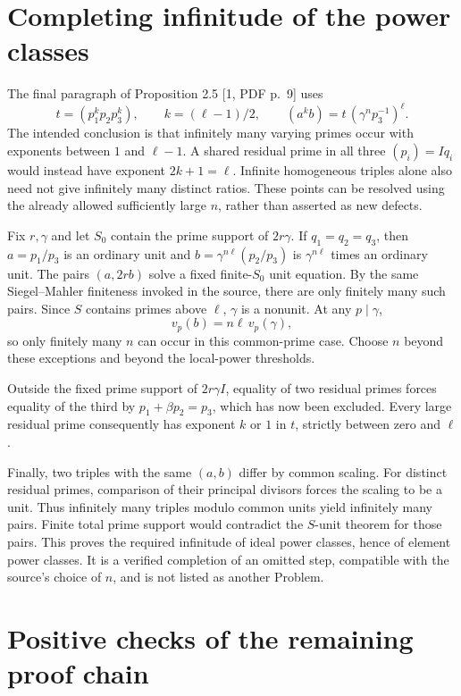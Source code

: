 \documentclass[10pt]{article}
\begin{document}
\section*{Completing infinitude of the power classes}
The final paragraph of Proposition 2.5 [1, PDF p. 9] uses \[t=(p_1^k p_2 p_3^k),\qquad k=(\ell-1)/2,
 \qquad (a^k b)= t\,(\gamma^n p_3^{-1})^\ell .\] The intended conclusion is that infinitely many varying primes occur with exponents between \(1\) and \(\ell-1\). A shared residual prime in all three \((p_i)=I q_i\) would instead have exponent \(2k+1=\ell\). Infinite homogeneous triples alone also need not give infinitely many distinct ratios. These points can be resolved using the already allowed sufficiently large \(n\), rather than asserted as new defects.\par
Fix \(r,\gamma\) and let \(S_0\) contain the prime support of \(2r\gamma\). If \(q_1= q_2= q_3\), then \(a=p_1/p_3\) is an ordinary unit and \(b=\gamma^{n\ell}(p_2/p_3)\) is \(\gamma^{n\ell}\) times an ordinary unit. The pairs \((a,2rb)\) solve a fixed finite-\(S_0\) unit equation. By the same Siegel–Mahler finiteness invoked in the source, there are only finitely many such pairs. Since \(S\) contains primes above \(\ell\), \(\gamma\) is a nonunit. At any \(p\mid\gamma\), \[v_{ p}(b)=n\ell\,v_{ p}(\gamma),\] so only finitely many \(n\) can occur in this common-prime case. Choose \(n\) beyond these exceptions and beyond the local-power thresholds.\par
Outside the fixed prime support of \(2r\gamma I\), equality of two residual primes forces equality of the third by \(p_1+\beta p_2=p_3\), which has now been excluded. Every large residual prime consequently has exponent \(k\) or \(1\) in \(t\), strictly between zero and \(\ell\).\par
Finally, two triples with the same \((a,b)\) differ by common scaling. For distinct residual primes, comparison of their principal divisors forces the scaling to be a unit. Thus infinitely many triples modulo common units yield infinitely many pairs. Finite total prime support would contradict the \(S\)-unit theorem for those pairs. This proves the required infinitude of ideal power classes, hence of element power classes. It is a verified completion of an omitted step, compatible with the source’s choice of \(n\), and is not listed as another Problem.\par
\section*{Positive checks of the remaining proof chain}
\end{document}
